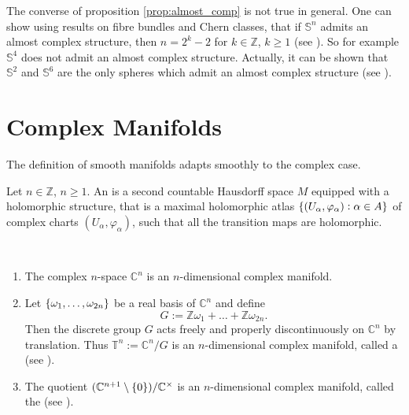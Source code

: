 \begin{remark}
The converse of proposition \ref{prop:almost_comp} is not true in general. One can show using results on fibre bundles and Chern classes, that if $\mathbb{S}^n$ admits an almost complex structure, then $n = 2^k - 2$ for $k \in \mathbb{Z}$, $k \geq 1$ (see \cite[219]{steenrod:topology_fibre:1951}). So for example $\mathbb{S}^4$ does not admit an almost complex structure. Actually, it can be shown that $\mathbb{S}^2$ and $\mathbb{S}^6$ are the only spheres which admit an almost complex structure (see \cite[434]{borel:steenrod:1953}).
\end{remark}

\section{Complex Manifolds}
The definition of smooth manifolds adapts smoothly to the complex case.

\begin{definition}
Let $n \in \mathbb{Z}$, $n \geq 1$. An  is a second countable Hausdorff space $M$ equipped with a holomorphic structure, that is a maximal holomorphic atlas $\cbr[0]{(U_\alpha, \varphi_\alpha) : \alpha \in A}$ of complex charts $(U_\alpha,\varphi_\alpha)$, such that all the transition maps are holomorphic.
\end{definition}

\begin{examples}
~
\begin{enumerate}[label = \arabic*.]
\item The complex $n$-space $\mathbb{C}^n$ is an $n$-dimensional complex manifold. 
\item Let $\cbr[0]{\omega_1,\dots,\omega_{2n}}$ be a real basis of $\mathbb{C}^n$ and define
\begin{equation}
G := \mathbb{Z}\omega_1 + \dots + \mathbb{Z}\omega_{2n}.
\end{equation}
Then the discrete group $G$ acts freely and properly discontinuously on $\mathbb{C}^n$ by translation. Thus $\mathbb{T}^n := \mathbb{C}^n/G$ is an $n$-dimensional complex manifold, called a  (see \cite[206--207]{grauert:complex_manifolds:2010}). 
\item The quotient $(\mathbb{C}^{n + 1} \setminus \cbr[0]{0})/\mathbb{C}^\times$ is an $n$-dimensional complex manifold, called the  (see \cite[208--210]{grauert:complex_manifolds:2010}).
\end{enumerate}
\end{examples}

